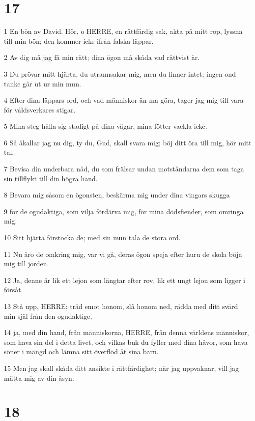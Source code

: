 \chapter{17}

\par 1 En bön av David. Hör, o HERRE, en rättfärdig sak, akta på mitt rop, lyssna till min bön; den kommer icke ifrån falska läppar.
\par 2 Av dig må jag få min rätt; dina ögon må skåda vad rättvist är.
\par 3 Du prövar mitt hjärta, du utrannsakar mig, men du finner intet; ingen ond tanke går ut ur min mun.
\par 4 Efter dina läppars ord, och vad människor än må göra, tager jag mig till vara för våldsverkares stigar.
\par 5 Mina steg hålla sig stadigt på dina vägar, mina fötter vackla icke.
\par 6 Så åkallar jag nu dig, ty du, Gud, skall svara mig; böj ditt öra till mig, hör mitt tal.
\par 7 Bevisa din underbara nåd, du som frälsar undan motståndarna dem som taga sin tillflykt till din högra hand.
\par 8 Bevara mig såsom en ögonsten, beskärma mig under dina vingars skugga
\par 9 för de ogudaktiga, som vilja fördärva mig, för mina dödsfiender, som omringa mig.
\par 10 Sitt hjärta förstocka de; med sin mun tala de stora ord.
\par 11 Nu äro de omkring mig, var vi gå, deras ögon speja efter huru de skola böja mig till jorden.
\par 12 Ja, denne är lik ett lejon som längtar efter rov, lik ett ungt lejon som ligger i försåt.
\par 13 Stå upp, HERRE; träd emot honom, slå honom ned, rädda med ditt svärd min själ från den ogudaktige,
\par 14 ja, med din hand, från människorna, HERRE, från denna världens människor, som hava sin del i detta livet, och vilkas buk du fyller med dina håvor, som hava söner i mängd och lämna sitt överflöd åt sina barn.
\par 15 Men jag skall skåda ditt ansikte i rättfärdighet; när jag uppvaknar, vill jag mätta mig av din åsyn.

\chapter{18}

